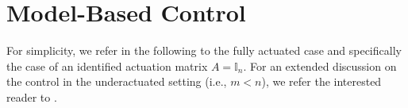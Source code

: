 \section{Model-Based Control}\label{sec:background:model_based_control}
For simplicity, we refer in the following to the fully actuated case and specifically the case of an identified actuation matrix $A = \mathbb{I}_n$.
For an extended discussion on the control in the underactuated setting (i.e., $m < n$), we refer the interested reader to \citet{pustina2025analysis}.